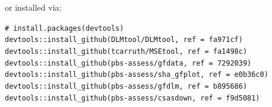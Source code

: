 \documentclass[11pt]{book}
\begin{document}
\vspace{4mm}

or installed via:

\texttt{\#\ install.packages(\textquotesingle{}devtools\textquotesingle{})}~\\
\texttt{devtools::install\_github(\textquotesingle{}DLMtool/DLMtool\textquotesingle{},\ ref\ =\ \textquotesingle{}fa971cf\textquotesingle{})}~\\
\texttt{devtools::install\_github(\textquotesingle{}tcarruth/MSEtool\textquotesingle{},\ ref\ =\ \textquotesingle{}fa1498c\textquotesingle{})}~\\
\texttt{devtools::install\_github(\textquotesingle{}pbs-assess/gfdata\textquotesingle{},\ ref\ =\ \textquotesingle{}7292039\textquotesingle{})}~\\
\texttt{devtools::install\_github(\textquotesingle{}pbs-assess/sha\_gfplot\textquotesingle{},\ ref\ =\ \textquotesingle{}e0b36c0\textquotesingle{})}~\\
\texttt{devtools::install\_github(\textquotesingle{}pbs-assess/gfdlm\textquotesingle{},\ ref\ =\ \textquotesingle{}b895686\textquotesingle{})}~\\
\texttt{devtools::install\_github(\textquotesingle{}pbs-assess/csasdown\textquotesingle{},\ ref\ =\ \textquotesingle{}f9d5081\textquotesingle{})}~\\

\clearpage
\end{document}
